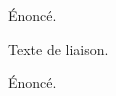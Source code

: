 \begin{theorem}
  Énoncé.
\end{theorem}
Texte de liaison.
\begin{proposition}
  Énoncé.
\end{proposition}
